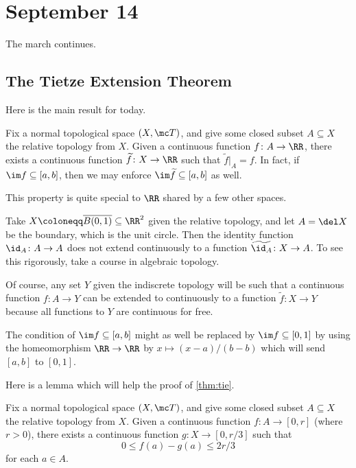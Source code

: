 \documentclass[../notes.tex]{subfiles}
\begin{document}
\section{September 14}

The march continues.

\subsection{The Tietze Extension Theorem}
Here is the main result for today.
\begin{theorem} \label{thm:tie}
	Fix a normal topological space $(X,\mc T)$, and give some closed subset $A\subseteq X$ the relative topology from $X$. Given a continuous function $f\colon A\to\RR$, there exists a continuous function $\widetilde f\colon X\to\RR$ such that $\widetilde f|_A=f$. In fact, if $\im f\subseteq[a,b]$, then we may enforce $\im\widetilde f\subseteq[a,b]$ as well.
\end{theorem}
This property is quite special to $\RR$ shared by a few other spaces.
\begin{example}
	Take $X\coloneqq\overline{B(0,1)}\subseteq\RR^2$ given the relative topology, and let $A=\del X$ be the boundary, which is the unit circle. Then the identity function $\id_A\colon A\to A$ does not extend continuously to a function $\widetilde{\id_A}\colon X\to A$. To see this rigorously, take a course in algebraic topology.
\end{example}
\begin{example}
	Of course, any set $Y$ given the indiscrete topology will be such that a continuous function $f\colon A\to Y$ can be extended to continuously to a function $\widetilde f\colon X\to Y$ because all functions to $Y$ are continuous for free.
\end{example}
\begin{remark}
	The condition of $\im f\subseteq[a,b]$ might as well be replaced by $\im f\subseteq[0,1]$ by using the homeomorphism $\RR\to\RR$ by $x\mapsto(x-a)/(b-b)$ which will send $[a,b]$ to $[0,1]$.
\end{remark}
Here is a lemma which will help the proof of \autoref{thm:tie}.
\begin{lemma} \label{lem:techtie}
	Fix a normal topological space $(X,\mc T)$, and give some closed subset $A\subseteq X$ the relative topology from $X$. Given a continuous function $f\colon A\to[0,r]$ (where $r>0$), there exists a continuous function $g\colon X\to[0,r/3]$ such that
	\[0\le f(a)-g(a)\le2r/3\]
	for each $a\in A$.
\end{lemma}
\end{document}

